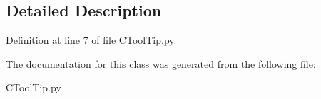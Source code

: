 \subsection{Detailed Description}


Definition at line 7 of file C\+Tool\+Tip.\+py.



The documentation for this class was generated from the following file\+:\begin{DoxyCompactItemize}
\item 
C\+Tool\+Tip.\+py\end{DoxyCompactItemize}
